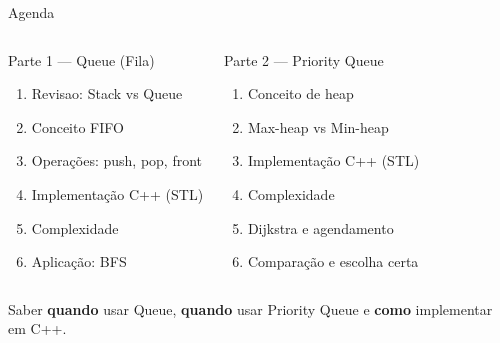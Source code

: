 \documentclass[aspectratio=169,10pt]{beamer}
\begin{document}
\begin{frame}{Agenda}
  \begin{columns}[t]
      \begin{block}{Parte 1 --- Queue (Fila)}
        \begin{enumerate}\footnotesize
          \item Revisao: Stack vs Queue
          \item Conceito FIFO
          \item Operações: push, pop, front
          \item Implementação C++ (STL)
          \item Complexidade
          \item Aplicação: BFS
        \end{enumerate}
      \end{block}
      \begin{block}{Parte 2 --- Priority Queue}
        \begin{enumerate}\footnotesize
          \item Conceito de heap
          \item Max-heap vs Min-heap
          \item Implementação C++ (STL)
          \item Complexidade
          \item Dijkstra e agendamento
          \item Comparação e escolha certa
        \end{enumerate}
      \end{block}
  \end{columns}
  \vspace{0.2cm}
  \begin{tcolorbox}[caixaAmarelo,title={Objetivo da aula}]
    \small Saber \textbf{quando} usar Queue, \textbf{quando} usar Priority Queue
    e \textbf{como} implementar em C++.
  \end{tcolorbox}
\end{frame}
\end{document}
